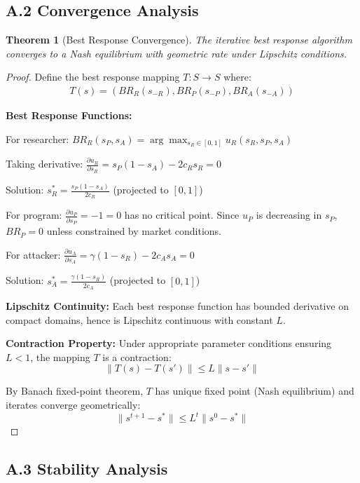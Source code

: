 \documentclass[journal]{IEEEtran}
\newtheorem{theorem}{Theorem}
\begin{document}
\subsection{A.2 Convergence Analysis}

\begin{theorem}[Best Response Convergence]
The iterative best response algorithm converges to a Nash equilibrium with geometric rate under Lipschitz conditions.
\end{theorem}

\begin{proof}
Define the best response mapping $T: S \rightarrow S$ where:
\begin{align}
T(s) = (BR_R(s_{-R}), BR_P(s_{-P}), BR_A(s_{-A}))
\end{align}

\textbf{Best Response Functions:}

For researcher: $BR_R(s_P, s_A) = \arg\max_{s_R \in [0,1]} u_R(s_R, s_P, s_A)$

Taking derivative: $\frac{\partial u_R}{\partial s_R} = s_P(1-s_A) - 2c_R s_R = 0$

Solution: $s_R^* = \frac{s_P(1-s_A)}{2c_R}$ (projected to $[0,1]$)

For program: $\frac{\partial u_P}{\partial s_P} = -1 = 0$ has no critical point.
Since $u_P$ is decreasing in $s_P$, $BR_P = 0$ unless constrained by market conditions.

For attacker: $\frac{\partial u_A}{\partial s_A} = \gamma(1-s_R) - 2c_A s_A = 0$

Solution: $s_A^* = \frac{\gamma(1-s_R)}{2c_A}$ (projected to $[0,1]$)

\textbf{Lipschitz Continuity:}
Each best response function has bounded derivative on compact domains, hence is Lipschitz continuous with constant $L$.

\textbf{Contraction Property:}
Under appropriate parameter conditions ensuring $L < 1$, the mapping $T$ is a contraction:
$$\|T(s) - T(s')\| \leq L \|s - s'\|$$

By Banach fixed-point theorem, $T$ has unique fixed point (Nash equilibrium) and iterates converge geometrically:
$$\|s^{t+1} - s^*\| \leq L^t \|s^0 - s^*\|$$
\end{proof}

\subsection{A.3 Stability Analysis}
\end{document}
